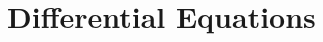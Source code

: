 \documentclass[../abcalc.tex]{subfiles}
\begin{document}
\chapter{Differential Equations}
\end{document}
